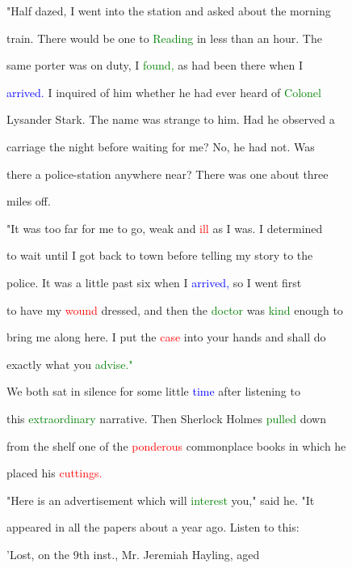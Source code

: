  "Half dazed, I went into the station and asked about the morning

 train. There would be one to \textcolor{green}{Reading} in less than an hour. The

 same porter was on duty, I \textcolor{green}{found,} as had been there when I

 \textcolor{blue}{arrived.} I inquired of him whether he had ever heard of \textcolor{green}{Colonel}

 Lysander \textcolor{BurntOrange}{Stark.} The name was strange to him. Had he observed a

 carriage the night before \textcolor{BurntOrange}{waiting} for me? No, he had not. Was

 there a police-station anywhere near? There was one about three

 miles off.



 "It was too far for me to go, weak and \textcolor{red}{ill} as I was. I determined

 to \textcolor{BurntOrange}{wait} until I got back to town before telling my story to the

 \textcolor{BurntOrange}{police.} It was a little past six when I \textcolor{blue}{arrived,} so I went first

 to have my \textcolor{red}{wound} dressed, and then the \textcolor{green}{doctor} was \textcolor{green}{kind} enough to

 bring me along here. I put the \textcolor{red}{case} into your hands and shall do

 exactly what you \textcolor{green}{advise."}



 We both sat in silence for some little \textcolor{blue}{time} after listening to

 this \textcolor{green}{extraordinary} narrative. Then Sherlock Holmes \textcolor{green}{pulled} down

 from the shelf one of the \textcolor{red}{ponderous} \textcolor{BurntOrange}{commonplace} books in which he

 placed his \textcolor{red}{cuttings.}



 "Here is an advertisement which will \textcolor{green}{interest} you," said he. "It

 appeared in all the papers about a year ago. Listen to this:

 \textcolor{BurntOrange}{'Lost,} on the 9th inst., Mr. Jeremiah Hayling, aged

